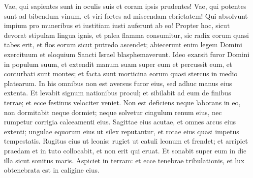 \begin{biblechapter}
\verse Vae, qui sapientes sunt in oculis suis et coram ipsis prudentes! 
\verse Vae, qui potentes sunt ad bibendum vinum, et viri fortes ad miscendam ebrietatem! 
\verse Qui absolvunt impium pro muneribus et iustitiam iusti auferunt ab eo! 
\verse Propter hoc, sicut devorat stipulam lingua ignis, et palea flamma consumitur, sic radix eorum quasi tabes erit, et flos eorum sicut putredo ascendet; abiecerunt enim legem Domini exercituum et eloquium Sancti Israel blasphemaverunt. 
\verse Ideo exarsit furor Domini in populum suum, et extendit manum suam super eum et percussit eum, et conturbati sunt montes; et facta sunt morticina eorum quasi stercus in medio platearum. In his omnibus non est aversus furor eius, sed adhuc manus eius extenta. 
\verse Et levabit signum nationibus procul; et sibilabit ad eum de finibus terrae; et ecce festinus velociter veniet. 
\verse Non est deficiens neque laborans in eo, non dormitabit neque dormiet; neque solvetur cingulum renum eius, nec rumpetur corrigia calceamenti eius. 
\verse Sagittae eius acutae, et omnes arcus eius extenti; ungulae equorum eius ut silex reputantur, et rotae eius quasi impetus tempestatis. 
\verse Rugitus eius ut leonis: rugiet ut catuli leonum et frendet; et arripiet praedam et in tuto collocabit, et non erit qui eruat. 
\verse Et sonabit super eum in die illa sicut sonitus maris. Aspiciet in terram: et ecce tenebrae tribulationis, et lux obtenebrata est in caligine eius. 
\end{biblechapter}

